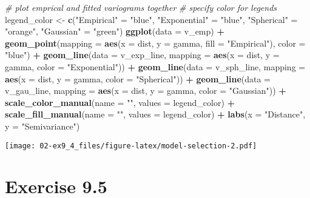 \documentclass[]{book}
\newenvironment{Shaded}{\begin{snugshade}}{\end{snugshade}}
\newcommand{\CommentTok}[1]{\textcolor[rgb]{0.56,0.35,0.01}{\textit{#1}}}
\newcommand{\DataTypeTok}[1]{\textcolor[rgb]{0.13,0.29,0.53}{#1}}
\newcommand{\KeywordTok}[1]{\textcolor[rgb]{0.13,0.29,0.53}{\textbf{#1}}}
\newcommand{\NormalTok}[1]{#1}
\newcommand{\OperatorTok}[1]{\textcolor[rgb]{0.81,0.36,0.00}{\textbf{#1}}}
\newcommand{\StringTok}[1]{\textcolor[rgb]{0.31,0.60,0.02}{#1}}
\begin{document}
\begin{Shaded}
\begin{Highlighting}[]
\CommentTok{# plot emprical and fitted variograms together  }
\CommentTok{# specify color for legends}
\NormalTok{legend_color <-}\StringTok{ }\KeywordTok{c}\NormalTok{(}\StringTok{"Empirical"}\NormalTok{ =}\StringTok{ "blue"}\NormalTok{, }\StringTok{"Exponential"}\NormalTok{ =}\StringTok{ "blue"}\NormalTok{,}
                  \StringTok{"Spherical"}\NormalTok{ =}\StringTok{ "orange"}\NormalTok{, }\StringTok{"Gaussian"}\NormalTok{ =}\StringTok{ "green"}\NormalTok{)}
\KeywordTok{ggplot}\NormalTok{(}\DataTypeTok{data =}\NormalTok{ v_emp) }\OperatorTok{+}
\StringTok{  }\KeywordTok{geom_point}\NormalTok{(}\DataTypeTok{mapping =} \KeywordTok{aes}\NormalTok{(}\DataTypeTok{x =}\NormalTok{ dist, }\DataTypeTok{y =}\NormalTok{ gamma, }\DataTypeTok{fill =} \StringTok{"Empirical"}\NormalTok{), }\DataTypeTok{color =} \StringTok{"blue"}\NormalTok{) }\OperatorTok{+}
\StringTok{  }\KeywordTok{geom_line}\NormalTok{(}\DataTypeTok{data =}\NormalTok{ v_exp_line, }\DataTypeTok{mapping =} \KeywordTok{aes}\NormalTok{(}\DataTypeTok{x =}\NormalTok{ dist, }\DataTypeTok{y =}\NormalTok{ gamma, }\DataTypeTok{color =} \StringTok{"Exponential"}\NormalTok{)) }\OperatorTok{+}
\StringTok{  }\KeywordTok{geom_line}\NormalTok{(}\DataTypeTok{data =}\NormalTok{ v_sph_line, }\DataTypeTok{mapping =} \KeywordTok{aes}\NormalTok{(}\DataTypeTok{x =}\NormalTok{ dist, }\DataTypeTok{y =}\NormalTok{ gamma, }\DataTypeTok{color =} \StringTok{"Spherical"}\NormalTok{)) }\OperatorTok{+}
\StringTok{  }\KeywordTok{geom_line}\NormalTok{(}\DataTypeTok{data =}\NormalTok{ v_gau_line, }\DataTypeTok{mapping =} \KeywordTok{aes}\NormalTok{(}\DataTypeTok{x =}\NormalTok{ dist, }\DataTypeTok{y =}\NormalTok{ gamma, }\DataTypeTok{color =} \StringTok{"Gaussian"}\NormalTok{)) }\OperatorTok{+}
\StringTok{  }\KeywordTok{scale_color_manual}\NormalTok{(}\DataTypeTok{name =} \StringTok{""}\NormalTok{, }\DataTypeTok{values =}\NormalTok{ legend_color) }\OperatorTok{+}
\StringTok{  }\KeywordTok{scale_fill_manual}\NormalTok{(}\DataTypeTok{name =} \StringTok{""}\NormalTok{, }\DataTypeTok{values =}\NormalTok{ legend_color) }\OperatorTok{+}
\StringTok{  }\KeywordTok{labs}\NormalTok{(}\DataTypeTok{x =} \StringTok{"Distance"}\NormalTok{,}
       \DataTypeTok{y =} \StringTok{"Semivariance"}\NormalTok{)}
\end{Highlighting}
\end{Shaded}

\texttt{[image: 02-ex9\_4\_files/figure-latex/model-selection-2.pdf]}

\hypertarget{ex9_5}{%
\chapter{Exercise 9.5}\label{ex9_5}}
\end{document}
